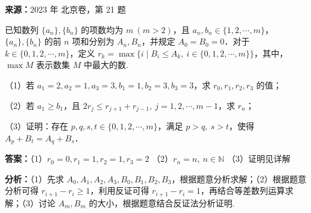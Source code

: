 \begin{question}[points=15]
\textbf{来源：}2023 年 北京卷，第 21 题\par
已知数列 $\{a_n\}, \{b_n\}$ 的项数均为 $m\ (m>2)$，且 $a_n, b_n \in \{1,2,\cdots,m\}$，$\{a_n\}, \{b_n\}$ 的前 $n$ 项和分别为 $A_n, B_n$，并规定 $A_0=B_0=0$．对于 $k\in\{0,1,2,\cdots,m\}$，定义 $r_k = \max\{i\mid B_i \le A_k,\ i\in\{0,1,2,\cdots,m\}\}$，其中，$\max M$ 表示数集 $M$ 中最大的数.

（1）若 $a_1=2, a_2=1, a_3=3, b_1=1, b_2=3, b_3=3$，求 $r_0, r_1, r_2, r_3$ 的值；

（2）若 $a_1\ge b_1$，且 $2r_j \le r_{j+1} + r_{j-1},\ j=1,2,\cdots,m-1$，求 $r_n$；

（3）证明：存在 $p,q,s,t\in\{0,1,2,\cdots,m\}$，满足 $p>q,\ s>t$，使得 $A_p + B_t = A_q + B_s$．
\begin{solution}
\textbf{答案：}（1）$r_0=0, r_1=1, r_2=1, r_3=2$ （2）$r_n=n,\ n\in\mathbb{N}$ （3）证明见详解

\textbf{分析：}（1）先求 $A_0,A_1,A_2,A_3,B_0,B_1,B_2,B_3$，根据题意分析求解；（2）根据题意分析可得 $r_{i+1}-r_i\ge 1$，利用反证可得 $r_{i+1}-r_i=1$，再结合等差数列运算求解；（3）讨论 $A_m, B_m$ 的大小，根据题意结合反证法分析证明.


\end{solution}
\end{question}
